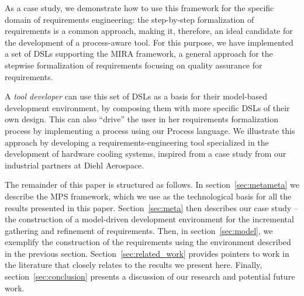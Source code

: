 As a case study, we demonstrate how to use this framework for the
specific domain of requirements engineering: the step-by-step formalization of requirements is a common approach,
making it, therefore, an ideal candidate for the development of a process-aware tool.
For this purpose, we have implemented a set of DSLs supporting the MIRA
\cite{MIRA13} framework, a general approach for the stepwise formalization of requirements
focusing on quality assurance for requirements.

A \emph{tool developer} can use this set of DSLs as a basis for their
model-based development environment, by composing them with more specific DSLs
of their own design. This can also ``drive'' the user in her requirements
formalization process by implementing a process using our \textsf{Process} language.
We illustrate this approach by developing a requirements-engineering tool
specialized in the development of hardware cooling systems, inspired from a case
study from our industrial partners at Diehl Aerospace.


The remainder of this paper is structured as follows.  In
section~\ref{sec:metameta} we describe the MPS framework, which we use as the
technological basis for all the results presented in this paper.
Section~\ref{sec:meta} then describes our case study -- the construction of a
model-driven development environment for the incremental gathering and
refinement of requirements. Then, in section~\ref{sec:model}, we exemplify the
construction of the requirements using the environment described in the previous
section. Section~\ref{sec:related_work} provides pointers to work in the
literature that closely relates to the results we present here. Finally,
section~\ref{sec:conclusion} presents a discussion of our research and potential
future work.
\vspace{-.5cm}

